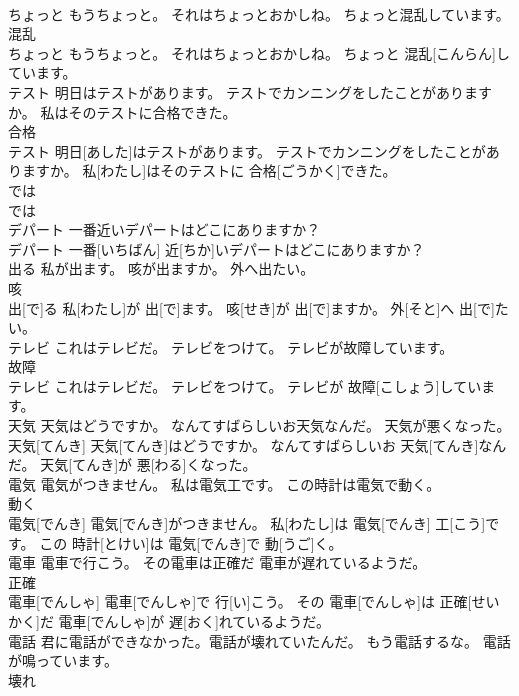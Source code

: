 \documentclass[8pt]{extreport}
\begin{document}
\begin{CJK}{UTF8}{min}
\\	ちょっと もうちょっと。 それはちょっとおかしね。 ちょっと混乱しています。	
\\	混乱 
\\	ちょっと もうちょっと。 それはちょっとおかしね。 ちょっと 混乱[こんらん]しています。
\\	テスト 明日はテストがあります。 テストでカンニングをしたことがありますか。 私はそのテストに合格できた。	
\\	合格 
\\	テスト 明日[あした]はテストがあります。 テストでカンニングをしたことがありますか。 私[わたし]はそのテストに 合格[ごうかく]できた。
\\	では	
\\	では
\\	デパート 一番近いデパートはどこにありますか？	
\\	デパート 一番[いちばん] 近[ちか]いデパートはどこにありますか？
\\	出る 私が出ます。 咳が出ますか。 外へ出たい。	
\\	咳 
\\	出[で]る 私[わたし]が 出[で]ます。 咳[せき]が 出[で]ますか。 外[そと]へ 出[で]たい。
\\	テレビ これはテレビだ。 テレビをつけて。 テレビが故障しています。	
\\	故障 
\\	テレビ これはテレビだ。 テレビをつけて。 テレビが 故障[こしょう]しています。
\\	天気 天気はどうですか。 なんてすばらしいお天気なんだ。 天気が悪くなった。	
\\	天気[てんき] 天気[てんき]はどうですか。 なんてすばらしいお 天気[てんき]なんだ。 天気[てんき]が 悪[わる]くなった。
\\	電気 電気がつきません。 私は電気工です。 この時計は電気で動く。	
\\	動く 
\\	電気[でんき] 電気[でんき]がつきません。 私[わたし]は 電気[でんき] 工[こう]です。 この 時計[とけい]は 電気[でんき]で 動[うご]く。
\\	電車 電車で行こう。 その電車は正確だ 電車が遅れているようだ。	
\\	正確 
\\	電車[でんしゃ] 電車[でんしゃ]で 行[い]こう。 その 電車[でんしゃ]は 正確[せいかく]だ 電車[でんしゃ]が 遅[おく]れているようだ。
\\	電話 君に電話ができなかった。電話が壊れていたんだ。 もう電話するな。 電話が鳴っています。	
\\	壊れ 

\end{CJK}
\end{document}
